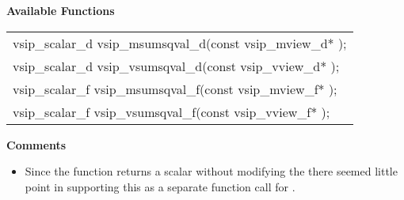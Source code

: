 \cvsiplh
\newline \hspace*{.8cm} \vspace*{.1cm} \textbf{Available Functions }
\newline \hspace*{1.1cm} {
\ttfamily
\begin{tabular}[H]{l}
vsip\_scalar\_d vsip\_msumsqval\_d(const vsip\_mview\_d* );\\
vsip\_scalar\_d vsip\_vsumsqval\_d(const vsip\_vview\_d* );\\
vsip\_scalar\_f vsip\_msumsqval\_f(const vsip\_mview\_f* );\\
vsip\_scalar\_f vsip\_vsumsqval\_f(const vsip\_vview\_f* );\\
\end{tabular}
}
\pyjvsiph
{}
\newline \hspace*{.8cm} \textbf{Comments}
\newline\hspace*{.9cm}\parbox{10.8cm}{\vspace*{.1cm}\begin{itemize}
\item{Since the  function returns a scalar without modifying the  there seemed little point in supporting this as a separate function call for \pyjv.}
\end{itemize}
}
